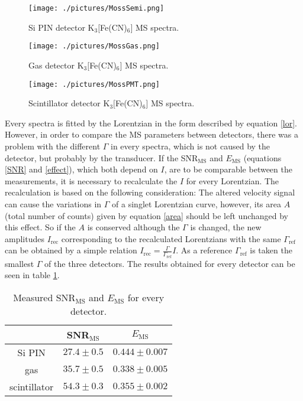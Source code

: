 \begin{figure}[H]
\centering
\texttt{[image: ./pictures/MossSemi.png]}
\caption{Si PIN detector K$_{3}[$Fe(CN)$_{6}]$ MS spectra.}
\label{Si PIN detector MS spectra.}

\end{figure}

\begin{figure}[H]
\centering
\texttt{[image: ./pictures/MossGas.png]}
\caption{Gas detector K$_{3}[$Fe(CN)$_{6}]$ MS spectra.}
\label{Gas detector MS spectra.}

\end{figure}

\begin{figure}[H]
\centering
\texttt{[image: ./pictures/MossPMT.png]}
\caption{Scintillator detector K$_{3}[$Fe(CN)$_{6}]$ MS spectra.}
\label{Scintillator detector MS spectra.}

\end{figure}


Every spectra is fitted by the Lorentzian in the form described by equation \ref{lor}. However, in order to compare the MS parameters between detectors, there was a problem with the different $\Gamma$ in every spectra, which is not caused by the detector, but probably by the transducer. If the SNR$_{\textrm{MS}}$ and $E_{\textrm{MS}}$ (equations \ref{SNR} and \ref{effect}), which both depend on $I$, are to be comparable between the measurements, it is necessary to recalculate the $I$ for every Lorentzian. The recalculation is based on the following consideration: The altered velocity signal can cause the variations in $\Gamma$ of a singlet Lorentzian curve, however, its area $A$ (total number of counts) given by equation \ref{area} should be left unchanged by this effect. So if the $A$ is conserved although the $\Gamma$ is changed, the new amplitudes $I_{\textrm{rec}}$ corresponding to the recalculated Lorentzians with the same $\Gamma_{\textrm{ref}}$  can be obtained by a simple relation $I_{\textrm{rec}} = \frac{\Gamma}{\Gamma_{\textrm{ref}}}I$. As a reference $\Gamma_{\textrm{ref}}$ is taken the smallest $\Gamma$ of the three detectors.
The results obtained for every detector can be seen in table \ref{mossres}.

\begin{table}[H]
\centering
\begin{tabular}{|c|c|c|}
\hline
   & SNR$_{\textrm{MS}}$ & $E_{\textrm{MS}}$ \\ \hline
Si PIN & $27.4 \pm 0.5$    & $0.444 \pm 0.007$  \\ \hline
gas & $35.7 \pm 0.5$    & $0.338 \pm 0.005$ \\ \hline
scintillator  & $54.3 \pm 0.3$    & $0.355 \pm 0.002$ \\ \hline
\end{tabular}
\caption{Measured SNR$_{\textrm{MS}}$ and $E_{\textrm{MS}}$ for every detector.}
 \label{mossres}
\end{table}


